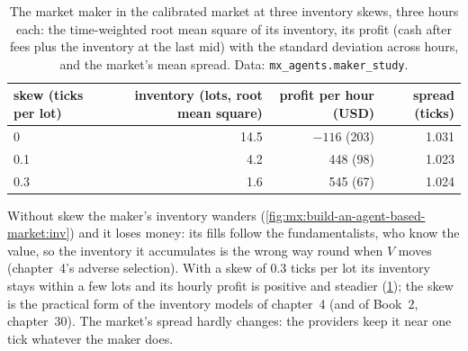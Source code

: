 \label{lst:mx:build-an-agent-based-market:mm}

\begin{table}[ht]
\centering
\small
\begin{tabular}{@{}lrrr@{}}
\toprule
skew (ticks per lot) & inventory (lots, root mean square) & profit per hour (USD) & spread (ticks) \\
\midrule
0 & 14.5 & $-116$ (203) & 1.031 \\
0.1 & 4.2 & 448 (98) & 1.023 \\
0.3 & 1.6 & 545 (67) & 1.024 \\
\bottomrule
\end{tabular}
\caption{The market maker in the calibrated market at three inventory skews, three hours each: the time-weighted root mean square of its inventory,
its profit (cash after fees plus the inventory at the last mid) with the standard deviation across hours, and the market's mean spread. Data:
\texttt{mx\_agents.maker\_study}.}\label{tab:mx:build-an-agent-based-market:mm}
\end{table}

Without skew the maker's inventory wanders (\cref{fig:mx:build-an-agent-based-market:inv}) and it loses money: its fills follow the fundamentalists,
who know the value, so the inventory it accumulates is the wrong way round when $V$ moves (chapter~4's adverse selection). With a skew of 0.3 ticks per
lot its inventory stays within a few lots and its hourly profit is positive and steadier (\cref{tab:mx:build-an-agent-based-market:mm}); the skew is
the practical form of the inventory models of chapter~4 (and of Book~2, chapter~30). The market's spread hardly changes: the providers keep it near one tick
whatever the maker does.

